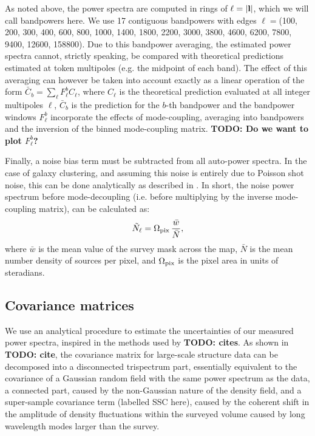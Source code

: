 \documentclass[a4paper,11pt]{article}
\newcommand{\todo}[1]{{\bf TODO: #1}}
\begin{document}
    As noted above, the power spectra are computed in rings of $\ell=|{\bf l}|$, which we will call bandpowers here. We use 17 contiguous bandpowers with edges $\ell=$(100, 200, 300, 400, 600, 800, 1000, 1400, 1800, 2200, 3000, 3800, 4600, 6200, 7800, 9400, 12600, 158800). Due to this bandpower averaging, the estimated power spectra cannot, strictly speaking, be compared with theoretical predictions estimated at token multipoles (e.g. the midpoint of each band). The effect of this averaging can however be taken into account exactly as a linear operation of the form $\bar{C}_b=\sum_\ell F^b_{\ell} C_\ell$, where $C_\ell$ is the theoretical prediction evaluated at all integer multipoles $\ell$, $\bar{C}_b$ is the prediction for the $b$-th bandpower and the bandpower windows $F^b_{\ell}$ incorporate the effects of mode-coupling, averaging into bandpowers and the inversion of the binned mode-coupling matrix. \todo{Do we want to plot $F^b_\ell$?}
    
    Finally, a noise bias term must be subtracted from all auto-power spectra. In the case of galaxy clustering, and assuming this noise is entirely due to Poisson shot noise, this can be done analytically as described in \cite{2019MNRAS.484.4127A}. In short, the noise power spectrum before mode-decoupling (i.e. before multiplying by the inverse mode-coupling matrix), can be calculated as:
    \begin{equation}\label{eq:nell}
      \tilde{N}_\ell = \Omega_{\rm pix}\,\frac{\bar{w}}{\bar{N}},
    \end{equation}
    where $\bar{w}$ is the mean value of the survey mask across the map, $\bar{N}$ is the mean number density of sources per pixel, and $\Omega_{\rm pix}$ is the pixel area in units of steradians.

  \subsection{Covariance matrices}\label{ssec:methods.covar}
    We use an analytical procedure to estimate the uncertainties of our measured power spectra, inspired in the methods used by \todo{cites}. As shown in \todo{cite}, the covariance matrix for large-scale structure data can be decomposed into a disconnected trispectrum part, essentially equivalent to the covariance of a Gaussian random field with the same power spectrum as the data, a connected part, caused by the non-Gaussian nature of the density field, and a super-sample covariance term (labelled SSC here), caused by the coherent shift in the amplitude of density fluctuations within the surveyed volume caused by long wavelength modes larger than the survey. 
    
\end{document}
